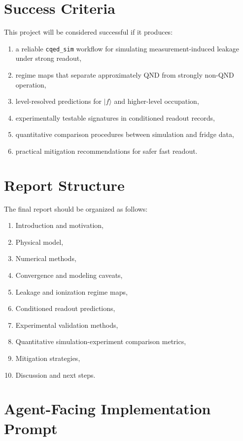\documentclass[11pt]{article}
\begin{document}
\section{Success Criteria}

This project will be considered successful if it produces:
\begin{enumerate}[leftmargin=2em]
    \item a reliable \texttt{cqed\_sim} workflow for simulating measurement-induced leakage
    under strong readout,
    \item regime maps that separate approximately QND from strongly non-QND operation,
    \item level-resolved predictions for $|f\rangle$ and higher-level occupation,
    \item experimentally testable signatures in conditioned readout records,
    \item quantitative comparison procedures between simulation and fridge data,
    \item practical mitigation recommendations for safer fast readout.
\end{enumerate}

\section{Report Structure}

The final report should be organized as follows:
\begin{enumerate}[leftmargin=2em]
    \item Introduction and motivation,
    \item Physical model,
    \item Numerical methods,
    \item Convergence and modeling caveats,
    \item Leakage and ionization regime maps,
    \item Conditioned readout predictions,
    \item Experimental validation methods,
    \item Quantitative simulation-experiment comparison metrics,
    \item Mitigation strategies,
    \item Discussion and next steps.
\end{enumerate}

\section{Agent-Facing Implementation Prompt}
\end{document}
